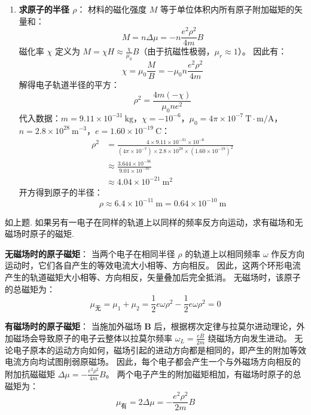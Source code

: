 \begin{solution}
\begin{enumerate}
    \item[(c)] \textbf{求原子的半径 $\rho$}：
    材料的磁化强度 $M$ 等于单位体积内所有原子附加磁矩的矢量和：
    $$ M = n \Delta \mu = - n \frac{e^2 \rho^2}{4m} B $$
    磁化率 $\chi$ 定义为 $M = \chi H \approx \frac{\chi}{\mu_0} B$（由于抗磁性极弱，$\mu_r \approx 1$）。
    因此有：
    $$ \chi = \mu_0 \frac{M}{B} = - \mu_0 n \frac{e^2 \rho^2}{4m} $$
    解得电子轨道半径的平方：
    $$ \rho^2 = \frac{4m(-\chi)}{\mu_0 n e^2} $$
    代入数据：$m = 9.11 \times 10^{-31} \ \mathrm{kg}$，$\chi = -10^{-6}$，$\mu_0 = 4\pi \times 10^{-7} \ \mathrm{T \cdot m / A}$，$n = 2.8 \times 10^{28} \ \mathrm{m^{-3}}$，$e = 1.60 \times 10^{-19} \ \mathrm{C}$：
    \[
    \begin{aligned}
    \rho^2 &= \frac{4 \times 9.11 \times 10^{-31} \times 10^{-6}}{(4\pi \times 10^{-7}) \times 2.8 \times 10^{28} \times (1.60 \times 10^{-19})^2}\\
      &\approx \frac{3.644 \times 10^{-36}}{9.01 \times 10^{-16}}\\
      &\approx 4.04 \times 10^{-21} \ \mathrm{m^2}
    \end{aligned}
    \]
    开方得到原子的半径：
    $$ \rho \approx 6.4 \times 10^{-11} \ \mathrm{m} = 0.64 \times 10^{-10} \ \mathrm{m} $$
\end{enumerate}
\end{solution}

\begin{exercise}\label{ex:19.2}
如上题. 如果另有一电子在同样的轨道上以同样的频率反方向运动，求有磁场和无磁场时原子的磁矩.
\end{exercise}
\begin{solution}
\textbf{无磁场时的原子磁矩}：
当两个电子在相同半径 $\rho$ 的轨道上以相同频率 $\omega$ 作反方向运动时，它们各自产生的等效电流大小相等、方向相反。
因此，这两个环形电流产生的轨道磁矩大小相等、方向相反，矢量叠加后完全抵消。
无磁场时，该原子的总磁矩为：
$$ \mu_{\text{无}} = \mu_1 + \mu_2 = \frac{1}{2} e \omega \rho^2 - \frac{1}{2} e \omega \rho^2 = 0 $$

\textbf{有磁场时的原子磁矩}：
当施加外磁场 $\boldsymbol{B}$ 后，根据楞次定律与拉莫尔进动理论，外加磁场会导致原子的电子云整体以拉莫尔频率 $\omega_L = \frac{eB}{2m}$ 绕磁场方向发生进动。
无论电子原本的运动方向如何，磁场引起的进动方向都是相同的，即产生的附加等效电流方向均试图削弱原磁场。
因此，每个电子都会产生一个与外磁场方向相反的附加抗磁磁矩 $\Delta \mu = - \frac{e^2 \rho^2}{4m} B$。
两个电子产生的附加磁矩相加，有磁场时原子的总磁矩为：
$$ \mu_{\text{有}} = 2 \Delta \mu = - \frac{e^2 \rho^2}{2m} B $$
\end{solution}

